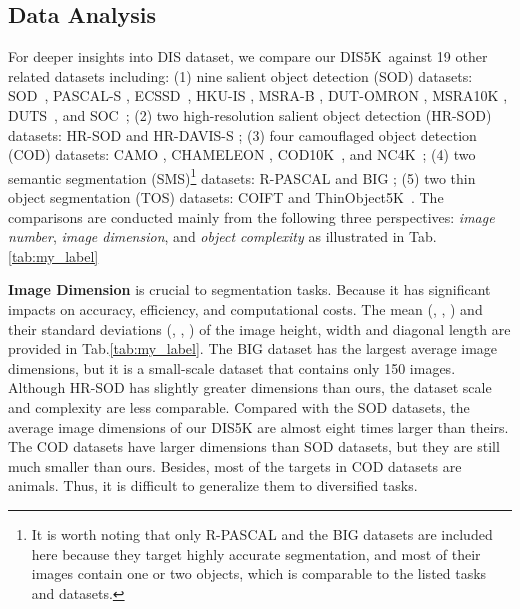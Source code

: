 \documentclass[10pt,twocolumn,letterpaper]{article}
\newcommand{\tabref}[1]{Tab.\ref{#1}}
\def \ourdataset{DIS5K}
\begin{document}
\subsection{Data Analysis}\label{sec:DA}
For deeper insights into DIS dataset, we compare our \ourdataset~against 
19 other related datasets including: 
(1) nine salient object detection (SOD) datasets: SOD~\cite{movahedi2010design}, PASCAL-S \cite{li2014secrets}, ECSSD~\cite{yan2013hierarchical},
HKU-IS \cite{li2015visual}, MSRA-B \cite{DBLP:journals/pami/LiuYSWZTS11}, 
DUT-OMRON \cite{yang2013saliency}, MSRA10K \cite{DBLP:journals/pami/ChengMHTH15}, DUTS~\cite{wang2017learning}, and SOC~\cite{fan2018SOC}; 
(2) two high-resolution salient object detection (HR-SOD) datasets: HR-SOD \cite{zeng2019towards} and HR-DAVIS-S \cite{perazzi2016benchmark,zeng2019towards}; 
(3) four camouflaged object detection (COD) datasets: CAMO \cite{le2019anabranch}, CHAMELEON \cite{chameleon}, COD10K~\cite{fan2020camouflaged}, and NC4K~\cite{lv2021simultaneously}; 
(4) two semantic segmentation (SMS)\footnote{
It is worth noting that only R-PASCAL and the BIG datasets are included here because they target highly accurate segmentation, and most of their images contain one or two objects, which is comparable to the listed tasks and datasets.} datasets: R-PASCAL \cite{everingham2010pascal,cheng2020cascadepsp} and BIG \cite{cheng2020cascadepsp}; 
(5) two thin object segmentation (TOS) datasets: COIFT \cite{liew2021deep} and ThinObject5K~\cite{liew2021deep}. 
The comparisons are conducted mainly from the following three perspectives: \textit{image number}, \textit{image dimension}, and \textit{object complexity} as illustrated in \tabref{tab:my_label}



\noindent\textbf{Image Dimension} is crucial to segmentation tasks. Because it has significant impacts on accuracy, efficiency, and computational costs. The mean (, , ) and their standard deviations (, , ) of the image height, width and diagonal length are provided in \tabref{tab:my_label}. The BIG dataset has the largest average image dimensions, but it is a small-scale dataset that contains only 150 images.
Although HR-SOD has slightly greater dimensions than ours, the dataset scale and complexity are less comparable. Compared with the SOD datasets, the average image dimensions of our DIS5K are almost eight times larger than theirs. 
The COD datasets have larger dimensions than SOD datasets, 
but they are still much smaller than ours. 
Besides, most of the targets in COD datasets are animals. 
Thus, it is difficult to generalize them to diversified tasks.
\end{document}
